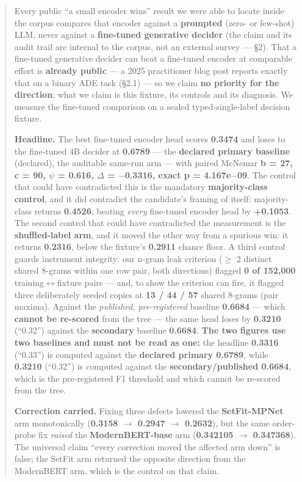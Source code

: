 \documentclass[10pt]{article}
\begin{document}
\begin{abstract}
Every public ``a small encoder wins'' result we were able to locate inside the corpus compares that encoder against a \textbf{prompted} (zero- or few-shot) LLM, never against a \textbf{fine-tuned generative decider} (the claim and its audit trail are internal to the corpus, not an external survey --- \S2). That a fine-tuned generative decider can beat a fine-tuned encoder at comparable effort is \textbf{already public} --- a 2025 practitioner blog post reports exactly that on a binary ADE task (\S2.1) --- so we claim \textbf{no priority for the direction}; what we claim is this fixture, its controls and its diagnosis. We measure the fine-tuned comparison on a sealed typed-single-label decision fixture.

\textbf{Headline.} The best fine-tuned encoder head scores \textbf{0.3474} and loses to the fine-tuned 4B decider at \textbf{0.6789} --- the \textbf{declared primary baseline} (declared), the auditable same-run arm --- with paired McNemar \textbf{b = 27, c = 90, $\psi$ = 0.616, $\Delta$ = $-$0.3316, exact p = 4.167e$-$09}. The control that could have contradicted this is the mandatory \textbf{majority-class control}, and it did contradict the candidate's framing of itself: majority-class returns \textbf{0.4526}, beating \emph{every} fine-tuned encoder head by \textbf{+0.1053}. The second control that could have contradicted the measurement is the \textbf{shuffled-label arm}, and it moved the other way from a spurious win: it returns \textbf{0.2316}, below the fixture's \textbf{0.2911} chance floor. A third control guards instrument integrity: our n-gram leak criterion ($\ge$ 2 distinct shared 8-grams within one row pair, both directions) flagged \textbf{0 of 152,000} training$\leftrightarrow$fixture pairs --- and, to show the criterion can fire, it flagged three deliberately seeded copies at \textbf{13 / 44 / 57} shared 8-grams (pair maxima). Against the \emph{published, pre-registered} baseline \textbf{0.6684} --- which \textbf{cannot be re-scored} from the tree --- the same head loses by \textbf{0.3210} (``0.32'') against the \textbf{secondary} baseline \textbf{0.6684}. \textbf{The two figures use two baselines and must not be read as one:} the headline \textbf{0.3316} (``0.33'') is computed against the \textbf{declared primary 0.6789}, while \textbf{0.3210} (``0.32'') is computed against the \textbf{secondary/published 0.6684}, which is the pre-registered F1 threshold and which cannot be re-scored from the tree.

\textbf{Correction carried.} Fixing three defects lowered the \textbf{SetFit-MPNet} arm monotonically (\textbf{0.3158 $\to$ 0.2947 $\to$ 0.2632}), but the same order-probe fix \emph{raised} the \textbf{ModernBERT-base} arm (\textbf{0.342105 $\to$ 0.347368}). The universal claim ``every correction moved the affected arm down'' is false; the SetFit arm returned the opposite direction from the ModernBERT arm, which is the control on that claim.


\end{abstract}
\end{document}
